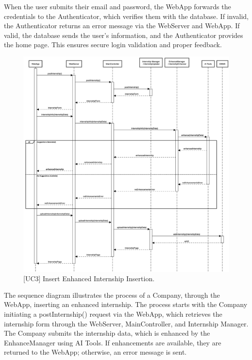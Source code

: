 When the user submits their email and password, the WebApp forwards the credentials to the Authenticator, which verifies them with the database. If invalid, the Authenticator returns an error message via the WebServer and WebApp. If valid, the database sends the user’s information, and the Authenticator provides the home page. This ensures secure login validation and proper feedback.

\begin{figure}[htbp]
    \centering
    \includegraphics[width=\linewidth]{DD/Images/sequenceDiagrams/EhnanceInternship.png}
    \caption{[UC3] Insert Enhanced Internship Insertion.}
    \label{fig:enhanceInternship_immagine}
\end{figure}
\clearpage

The sequence diagram illustrates the process of a Company, through the WebApp, inserting an enhanced internship. The process starts with the Company initiating a postInternship() request via the WebApp, which retrieves the internship form through the WebServer, MainController, and Internship Manager. The Company submits the internship data, which is enhanced by the EnhanceManager using AI Tools. If enhancements are available, they are returned to the WebApp; otherwise, an error message is sent.

